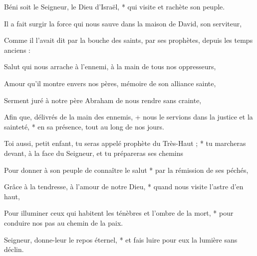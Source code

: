 \item Béni soit le Seigneur, le Dieu d’Israël, * qui visite et rachète son peuple.

\item Il a fait surgir la force qui nous sauve dans la maison de David, son serviteur,

\item Comme il l’avait dit par la bouche des saints, par ses prophètes, depuis les temps anciens :

\item Salut qui nous arrache à l’ennemi, à la main de tous nos oppresseurs,

\item Amour qu’il montre envers nos pères, mémoire de son alliance sainte,

\item Serment juré à notre père Abraham de nous rendre sans crainte,

\item Afin que, délivrés de la main des ennemis, + nous le servions dans la justice et la sainteté, * en sa présence, tout au long de nos jours.

\item Toi aussi, petit enfant, tu seras appelé prophète du Très-Haut ; * tu marcheras devant, à la face du Seigneur, et tu prépareras ses chemins

\item Pour donner à son peuple de connaître le salut * par la rémission de ses péchés,

\item Grâce à la tendresse, à l’amour de notre Dieu, * quand nous visite l’astre d’en haut,

\item Pour illuminer ceux qui habitent les ténèbres et l’ombre de la mort, * pour conduire nos pas au chemin de la paix.

\item Seigneur, donne-leur le repos éternel, * et fais luire pour eux la lumière sans déclin.